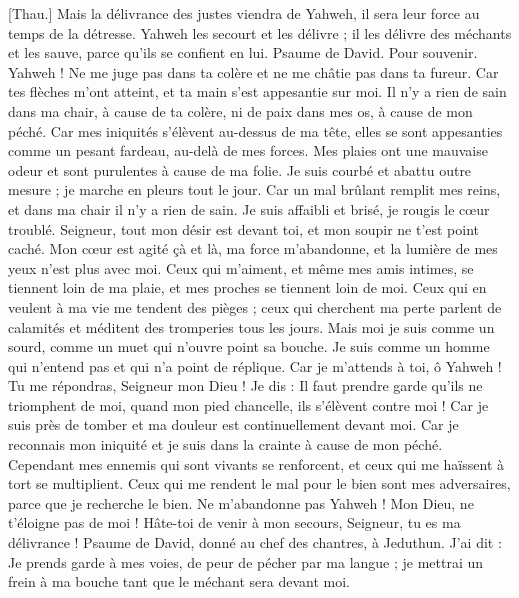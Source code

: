 \begin{multicols}{2}
[Thau.] Mais la délivrance des justes viendra de Yahweh, il sera leur force au temps de la détresse.
Yahweh les secourt et les délivre ; il les délivre des méchants et les sauve, parce qu'ils se confient en lui.
\VerseOne{}Psaume de David. Pour souvenir.
Yahweh ! Ne me juge pas dans ta colère et ne me châtie pas dans ta fureur.
Car tes flèches m’ont atteint, et ta main s'est appesantie sur moi.
Il n'y a rien de sain dans ma chair, à cause de ta colère, ni de paix dans mes os, à cause de mon péché.
Car mes iniquités s’élèvent au-dessus de ma tête, elles se sont appesanties comme un pesant fardeau, au-delà de mes forces.
Mes plaies ont une mauvaise odeur et sont purulentes à cause de ma folie.
Je suis courbé et abattu outre mesure ; je marche en pleurs tout le jour.
Car un mal brûlant remplit mes reins, et dans ma chair il n'y a rien de sain.
Je suis affaibli et brisé, je rougis le cœur troublé.
Seigneur, tout mon désir est devant toi, et mon soupir ne t'est point caché.
Mon cœur est agité çà et là, ma force m'abandonne, et la lumière de mes yeux n’est plus avec moi.
Ceux qui m'aiment, et même mes amis intimes, se tiennent loin de ma plaie, et mes proches se tiennent loin de moi.
Ceux qui en veulent à ma vie me tendent des pièges ; ceux qui cherchent ma perte parlent de calamités et méditent des tromperies tous les jours.
Mais moi je suis comme un sourd, comme un muet qui n'ouvre point sa bouche.
Je suis comme un homme qui n'entend pas et qui n'a point de réplique.
Car je m’attends à toi, ô Yahweh ! Tu me répondras, Seigneur mon Dieu !
Je dis : Il faut prendre garde qu'ils ne triomphent de moi, quand mon pied chancelle, ils s'élèvent contre moi !
Car je suis près de tomber et ma douleur est continuellement devant moi.
Car je reconnais mon iniquité et je suis dans la crainte à cause de mon péché.
Cependant mes ennemis qui sont vivants se renforcent, et ceux qui me haïssent à tort se multiplient.
Ceux qui me rendent le mal pour le bien sont mes adversaires, parce que je recherche le bien.
Ne m'abandonne pas Yahweh ! Mon Dieu, ne t'éloigne pas de moi !
Hâte-toi de venir à mon secours, Seigneur, tu es ma délivrance !
\VerseOne{}Psaume de David, donné au chef des chantres, à Jeduthun.
J'ai dit : Je prends garde à mes voies, de peur de pécher par ma langue ; je mettrai un frein à ma bouche tant que le méchant sera devant moi.

\end{multicols}
